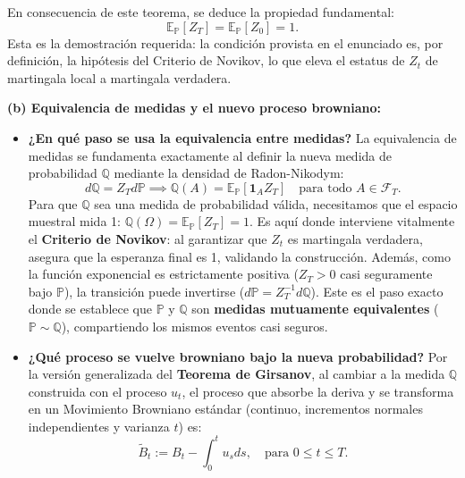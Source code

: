 \documentclass[11pt, letterpaper]{article}
\begin{document}
\begin{solucion}
    En consecuencia de este teorema, se deduce la propiedad fundamental:
    \[ \mathbb{E}_{\mathbb{P}}[Z_T] = \mathbb{E}_{\mathbb{P}}[Z_0] = 1. \]
    Esta es la demostración requerida: la condición provista en el enunciado es, por definición, la hipótesis del Criterio de Novikov, lo que eleva el estatus de $Z_t$ de martingala local a martingala verdadera.

    \vspace{3mm}
    \textbf{(b) Equivalencia de medidas y el nuevo proceso browniano:}

    \begin{itemize}
        \item \textbf{¿En qué paso se usa la equivalencia entre medidas?}
        La equivalencia de medidas se fundamenta exactamente al definir la nueva medida de probabilidad $\mathbb{Q}$ mediante la densidad de Radon-Nikodym:
        \[ d\mathbb{Q} = Z_T d\mathbb{P} \implies \mathbb{Q}(A) = \mathbb{E}_{\mathbb{P}}[\mathbf{1}_A Z_T] \quad \text{para todo } A \in \mathcal{F}_T. \]
        Para que $\mathbb{Q}$ sea una medida de probabilidad válida, necesitamos que el espacio muestral mida 1: $\mathbb{Q}(\Omega) = \mathbb{E}_{\mathbb{P}}[Z_T] = 1$. Es aquí donde interviene vitalmente el \textbf{Criterio de Novikov}: al garantizar que $Z_t$ es martingala verdadera, asegura que la esperanza final es 1, validando la construcción. 
        Además, como la función exponencial es estrictamente positiva ($Z_T > 0$ casi seguramente bajo $\mathbb{P}$), la transición puede invertirse ($d\mathbb{P} = Z_T^{-1} d\mathbb{Q}$). Este es el paso exacto donde se establece que $\mathbb{P}$ y $\mathbb{Q}$ son \textbf{medidas mutuamente equivalentes} ($\mathbb{P} \sim \mathbb{Q}$), compartiendo los mismos eventos casi seguros.

        \item \textbf{¿Qué proceso se vuelve browniano bajo la nueva probabilidad?}
        Por la versión generalizada del \textbf{Teorema de Girsanov}, al cambiar a la medida $\mathbb{Q}$ construida con el proceso $u_t$, el proceso que absorbe la deriva y se transforma en un Movimiento Browniano estándar (continuo, incrementos normales independientes y varianza $t$) es:
        \[ \tilde{B}_t := B_t - \int_0^t u_s ds, \quad \text{para } 0 \le t \le T. \]
    \end{itemize}
\end{solucion}

\newpage
\end{document}
